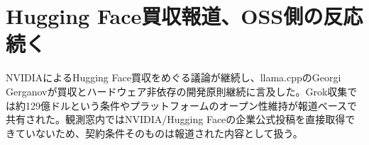 \section{Hugging Face買収報道、OSS側の反応続く}

NVIDIAによるHugging Face買収をめぐる議論が継続し、llama.cppのGeorgi Gerganovが買収とハードウェア非依存の開発原則継続に言及した。Grok収集では約129億ドルという条件やプラットフォームのオープン性維持が報道ベースで共有された。観測窓内ではNVIDIA/Hugging Faceの企業公式投稿を直接取得できていないため、契約条件そのものは報道された内容として扱う。

